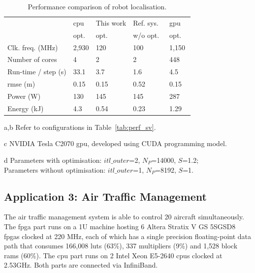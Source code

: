\begin{table}[h]
	\setlength{\tabcolsep}{2pt}
	\begin{spacing}{1.0}
	\caption{Performance comparison of robot localisation.}
	\label{tab:perf_mcl1}
	\centering
	\smallskip
	\begin{threeparttable}
		\begin{tabular}{l|x{3cm}y{3cm}x{3cm}x{3cm}}
			\hline
															& \gls{cpu} 							& This work  				& Ref. sys.~\cite{chau13a}  	& \gls{gpu} \\
															& opt.~		&	opt.~		& w/o opt.~		& opt. ~ \\
			\hline
			\hline
			Clk. freq. (MHz) 	& 2,930 & 120 	& 100 	& 1,150 \\
			Number of cores					& 4		& 2 	& 2 	& 448 \\
			\hline
			\hline
			Run-time / step (s) 	& 33.1	& 3.7	& 1.6			& 4.5 \\
			\gls{rmse} (m)								& 0.15	& 0.15	& 0.52	& 0.15 \\
			Power (W)								& 130		& 145 	& 145		& 287 \\
			Energy (kJ)							& 4.3		& 0.54	& 0.23	& 1.29 \\
			\hline
		\end{tabular}
		\begin{tablenotes}
		\item[a,b] Refer to configurations in Table~\ref{tab:perf_sv}.
		\item[c] NVIDIA Tesla C2070 \gls{gpu}, developed using CUDA programming model.
		\item[d] Parameters with optimisation: $itl\_outer$=2, $N_P$=14000, $S$=1.2; \\ Parameters without optimisation: $itl\_outer$=1, $N_P$=8192, $S$=1. 
		\end{tablenotes}
	\end{threeparttable}
	\end{spacing}
\end{table}

\subsection{Application 3: Air Traffic Management}

The air traffic management system is able to control 20 aircraft simultaneously.
The \gls{fpga} part runs on a 1U machine hosting 6 Altera Stratix V GS 5SGSD8 \gls{fpga}s clocked at 220 MHz, 
each of which has a single precision floating-point data path that consumes 166,008 \glspl{lut} (63\%), 337 multipliers (9\%) and 1,528 block \glspl{ram} (60\%).
The \gls{cpu} part runs on 2 Intel Xeon E5-2640 \gls{cpu}s clocked at 2.53GHz.
Both parts are connected via InfiniBand.

